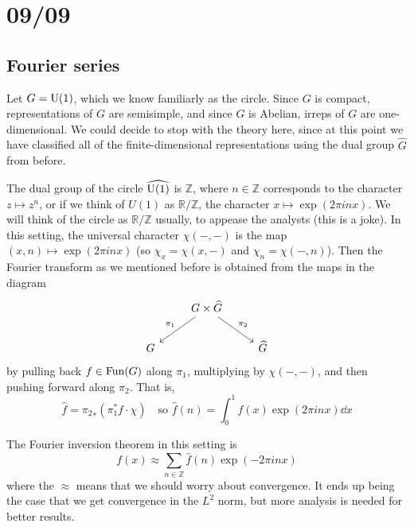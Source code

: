 \documentclass[../../rtnotes.tex]{subfiles}
\begin{document}
\section{09/09}
\subsection{Fourier series}
Let $G = \operatorname{U}(1)$, which we know familiarly as the circle. Since $G$ is compact, representations of $G$ are semisimple, and since $G$ is Abelian, irreps of $G$ are one-dimensional. We could decide to stop with the theory here, since at this point we have classified all of the finite-dimensional representations using the dual group $\widehat G$ from before.

The dual group of the circle $\widehat{\operatorname{U}(1)}$ is $\mathbb Z$, where $n\in\mathbb Z$ corresponds to the character $z\mapsto z^n$, or if we think of $U(1)$ as $\mathbb R/\mathbb Z$, the character $x\mapsto \exp(2\pi inx)$. We will think of the circle as $\mathbb R/\mathbb Z$ usually, to appease the analysts (this is a joke). In this setting, the universal character $\chi(-,-)$ is the map $(x,n)\mapsto \exp(2\pi i nx )$ (so $\chi_x = \chi(x,-)$ and $\chi_n = \chi(-,n)$). Then the Fourier transform as we mentioned before is obtained from the maps in the diagram 
\[\begin{tikzcd}
	& {G\times \widehat G} \\
	G && {\widehat G}
	\arrow["{\pi_1}"', from=1-2, to=2-1]
	\arrow["{\pi_2}", from=1-2, to=2-3]
\end{tikzcd}\]
by pulling back $f\in \operatorname{Fun}(G)$ along $\pi_1$, multiplying by $\chi(-,-)$, and then pushing forward along $\pi_2$. That is, 
\[\hat f = {\pi_2}_\ast(\pi_1^\ast f\cdot \chi)\quad\text{so }\hat f(n) = \int_0^1 f(x)\exp(2\pi inx)\dd x\]

The Fourier inversion theorem in this setting is
\[f(x) \approx \sum_{n\in\mathbb Z}\hat f(n)\exp(-2\pi i nx)\]
where the $\approx$ means that we should worry about convergence. It ends up being the case that we get convergence in the $L^2$ norm, but more analysis is needed for better results.
\end{document}
